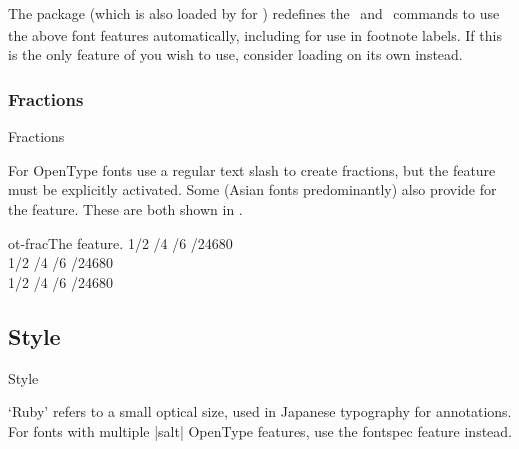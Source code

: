 The  package
(which is also loaded by  for \XeTeX)
redefines the \cmd\textsubscript\ and
\cmd\textsuperscript\ commands to use the above font features automatically,
including for use in footnote labels.
If this is the only feature of  you wish to use, consider
loading  on its own instead.


\subsubsection{Fractions}

\begin{features}{Fractions}
\end{features}

For OpenType fonts use a regular text slash to create fractions, but
the  feature must be explicitly activated.
Some (Asian fonts predominantly) also provide for the
 feature. These are both shown in .

\begin{Xexample}{ot-frac}{The  feature.}
   1/2 /4 /6 /24680 \\
   1/2 /4 /6 /24680 \\
   1/2 /4 /6 /24680 \\
\end{Xexample}

\subsection{Style}
\label{sec:ot-feat-style}

\begin{features}{Style}
\end{features}

`Ruby' refers to a small optical size, used in
Japanese typography for annotations.
For fonts with multiple |salt| OpenType features,
use the fontspec  feature instead.

